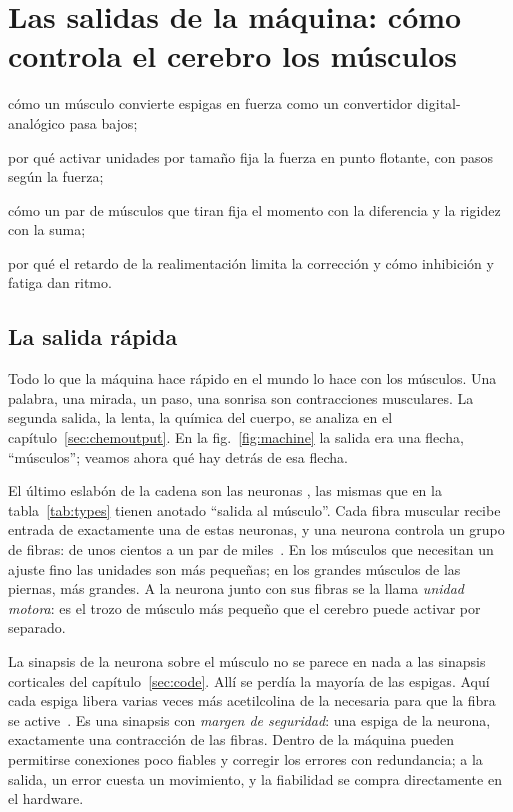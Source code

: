 \chapter{Las salidas de la máquina: cómo controla el cerebro los músculos}
\label{sec:muscles}
\begin{chaptergoals}
\item cómo un músculo convierte espigas en fuerza como un convertidor digital-analógico pasa bajos;
\item por qué activar unidades por tamaño fija la fuerza en punto flotante, con pasos según la fuerza;
\item cómo un par de músculos que tiran fija el momento con la diferencia y la rigidez con la suma;
\item por qué el retardo de la realimentación limita la corrección y cómo inhibición y fatiga dan ritmo.
\end{chaptergoals}

\section{La salida rápida}

Todo lo que la máquina hace rápido en el mundo lo hace con los músculos. Una palabra, una mirada, un paso, una sonrisa son contracciones musculares. La segunda salida, la lenta, la química del cuerpo, se analiza en el capítulo~\ref{sec:chemoutput}. En la fig.~\ref{fig:machine} la salida era una flecha, “músculos”; veamos ahora qué hay detrás de esa flecha.

El último eslabón de la cadena son las neuronas , las mismas que en la tabla~\ref{tab:types} tienen anotado “salida al músculo”. Cada fibra muscular recibe entrada de exactamente una de estas neuronas, y una neurona controla un grupo de fibras: de unos cientos a un par de miles~\cite{Feinstein1955mu}. En los músculos que necesitan un ajuste fino las unidades son más pequeñas; en los grandes músculos de las piernas, más grandes. A la neurona junto con sus fibras se la llama \emph{unidad motora}: es el trozo de músculo más pequeño que el cerebro puede activar por separado.

La sinapsis de la neurona sobre el músculo no se parece en nada a las sinapsis corticales del capítulo~\ref{sec:code}. Allí se perdía la mayoría de las espigas. Aquí cada espiga libera varias veces más acetilcolina de la necesaria para que la fibra se active~\cite{WoodSlater2001}. Es una sinapsis con \emph{margen de seguridad}: una espiga de la neurona, exactamente una contracción de las fibras. Dentro de la máquina pueden permitirse conexiones poco fiables y corregir los errores con redundancia; a la salida, un error cuesta un movimiento, y la fiabilidad se compra directamente en el hardware.

